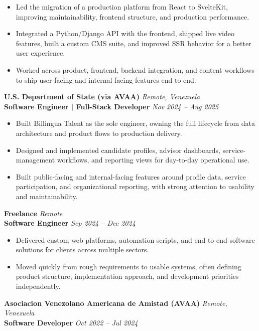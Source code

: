 \documentclass[11pt]{article}
\begin{document}
\begin{itemize}
    \item Led the migration of a production platform from React to SvelteKit, improving maintainability, frontend structure, and production performance.
    \item Integrated a Python/Django API with the frontend, shipped live video features, built a custom CMS suite, and improved SSR behavior for a better user experience.
    \item Worked across product, frontend, backend integration, and content workflows to ship user-facing and internal-facing features end to end.
\end{itemize}
\vspace{10pt}
\textbf{U.S. Department of State (via AVAA)} \hfill \textit{Remote, Venezuela} \\
\textbf{Software Engineer | Full-Stack Developer} \hfill \textit{Nov 2024 -- Aug 2025}
\begin{itemize}
    \item Built Billingua Talent as the sole engineer, owning the full lifecycle from data architecture and product flows to production delivery.
    \item Designed and implemented candidate profiles, advisor dashboards, service-management workflows, and reporting views for day-to-day operational use.
    \item Built public-facing and internal-facing features around profile data, service participation, and organizational reporting, with strong attention to usability and maintainability.
\end{itemize}
\vspace{10pt}
\textbf{Freelance} \hfill \textit{Remote} \\
\textbf{Software Engineer} \hfill \textit{Sep 2024 -- Dec 2024}
\begin{itemize}
    \item Delivered custom web platforms, automation scripts, and end-to-end software solutions for clients across multiple sectors.
    \item Moved quickly from rough requirements to usable systems, often defining product structure, implementation approach, and development priorities independently.
\end{itemize}
\vspace{10pt}
\textbf{Asociacion Venezolano Americana de Amistad (AVAA)} \hfill \textit{Remote, Venezuela} \\
\textbf{Software Developer} \hfill \textit{Oct 2022 -- Jul 2024}
\end{document}
